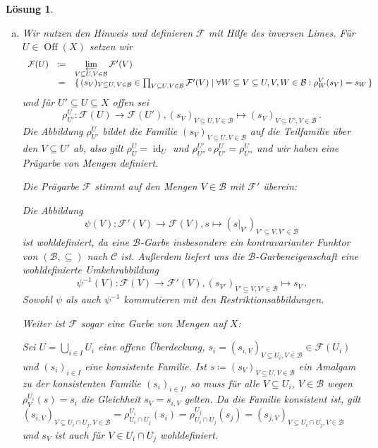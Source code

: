 \documentclass[a4paper,12pt]{report}
\theoremstyle{break}
\newtheorem{Loes}{L\"osung}
\theoremstyle{nonumberbreak}
\theoremstyle{nonumberplain}
\DeclareMathOperator{\Off}{Off}
\DeclareMathOperator{\id}{id}
\newcommand{\F}{\mathcal{F}} %
\begin{document}
\begin{Loes}
\begin{enumerate}[a)]%
 \item Wir nutzen den Hinweis und definieren $\F$ mit Hilfe des inversen Limes. F\"ur $U \in \Off(X)$ setzen wir 
 $$\begin{array}{rcl}
    \F(U) &\coloneqq& \varprojlim\limits_{V \subseteq U, V \in \mathcal{B}} \F'(V) \\
    &=& \{ \, (s_V)_{V \subseteq U, \, V \in \mathcal{B}} \in \prod_{V \subseteq U, V \in \mathcal{B}} \F'(V) \mid \forall W \subseteq V \subseteq U, V,W \in \mathcal{B}: \rho^V_W(s_V) = s_W \, \}
   \end{array}
$$
und f\"ur $U' \subseteq U \subseteq X$ offen sei
$$
\rho^U_{U'} \colon \F(U) \to \F(U'), (s_V)_{V \subseteq U, V \in \mathcal{B}} \mapsto (s_V)_{V \subseteq U', V \in \mathcal{B}}\,.
$$
Die Abbildung $\rho^U_{U'}$ bildet die Familie $(s_V)_{V \subseteq U, V \in \mathcal{B}}$ auf die Teilfamilie \"uber den $V \subseteq U'$ ab, also gilt $\rho^U_U = \id_U$ und $\rho^{U'}_{U''} \circ \rho^U _ {U'} = \rho^U_{U''}$
und wir haben eine Pr\"agarbe von Mengen definiert.

Die Pr\"agarbe $\F$ stimmt auf den Mengen $V \in \mathcal{B}$ mit $\F'$ \"uberein: 

Die Abbildung
$$
\psi(V)\colon \F'(V) \to \F(V), s \mapsto (s|_{V'})_{V' \subseteq V, V' \in \mathcal{B}}
$$
ist wohldefiniert, da eine $\mathcal{B}$-Garbe insbesondere ein kontravarianter Funktor von $(\mathcal{B}, \subseteq)$ nach $\mathcal{C}$ ist. Au\ss erdem liefert uns die $\mathcal{B}$-Garbeneigenschaft eine wohldefinierte Umkehrabbildung
$$
\psi^{-1}(V)\colon \F(V) \to \F'(V),  (s_{V'})_{V' \subseteq V, V' \in \mathcal{B}} \mapsto s_V\,.
$$
Sowohl $\psi$ als auch $\psi^{-1}$ kommutieren mit den Restriktionsabbildungen.

Weiter ist $\F$ sogar eine Garbe von Mengen auf $X$:

Sei $U = \bigcup_{i \in I} U_i$ eine offene \"Uberdeckung, $s_i = (s_{i,V} )_{V \subseteq U_i, V \in \mathcal{B}} \in \F(U_i)$ und $(s_i)_{i\in I}$ eine konsistente Familie. 
Ist $s \coloneqq (s_V)_{V \subseteq U, V \in \mathcal{B}}$  ein Amalgam zu der konsistenten Familie $(s_i)_{i \in I}$, so muss f\"ur alle $V \subseteq U_i$, $V \in \mathcal{B}$ wegen $\rho^{U_i}_V(s) = s_i$ die Gleichheit $s_V = s_{i,V}$ gelten. Da die Familie konsistent ist, gilt $(s_{i,V})_{V \subseteq U_i\cap U_j, V \in \mathcal{B}} = \rho^{U_i}_{U_i \cap U_j}(s_i) = \rho^{U_j}_{U_i \cap U_j}(s_j) = (s_{j,V} )_{V \subseteq U_i\cap U_j, V \in \mathcal{B}}$ und $s_V$ ist auch f\"ur $V \in U_i \cap U_j$ wohldefiniert. 


\end{enumerate}
\end{Loes}
\end{document}
